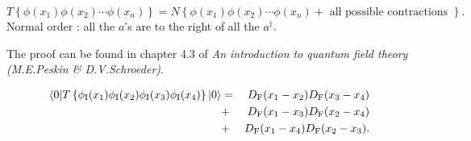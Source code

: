 \begin{newthem}
\[T \left\{ \phi(x_1) \phi(x_2) \cdots \phi(x_n)\right\} = N \left\{ \phi(x_1) \phi(x_2) \cdots \phi(x_n) + \mbox{ all possible contractions }\right\} .\]
Normal order : all the $a$'s are to the right of all the $a^{\dagger}$.
\end{newthem}
\noindent
The proof can be found in chapter 4.3 of \emph{An introduction to quantum field theory (M.E.Peskin \& D.V.Schroeder)}.
\begin{example}
\begin{eqnarray}
\langle 0 | T \left\{ \phi_{\rm I}(x_1) \phi_{\rm I}(x_2) \phi_{\rm I}(x_3) \phi_{\rm I}(x_4)\right\}| 0 \rangle &=& D_{\rm F}(x_1-x_2)D_{\rm F}(x_3-x_4) \nonumber \\
&+& D_{\rm F}(x_1-x_3)D_{\rm F}(x_2-x_4) \nonumber \\
&+& D_{\rm F}(x_1-x_4)D_{\rm F}(x_2-x_3) .\nonumber
\end{eqnarray}
\end{example}

